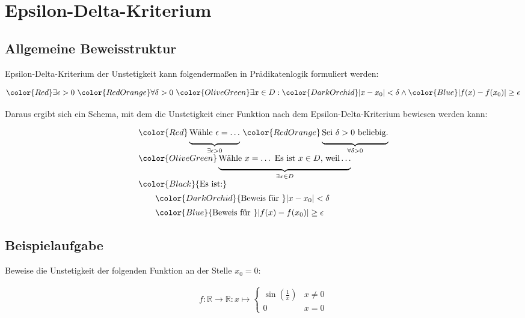 \documentclass[fontsize=9pt,
               parskip=half-,
               DIV=14,
               listof=chapterentry,
               tocflat]{scrbook}
\begin{document}
\section{Epsilon-Delta-Kriterium}

\subsection{Allgemeine Beweisstruktur}

Epsilon-Delta-Kriterium der Unstetigkeit kann folgendermaßen in Prädikatenlogik formuliert werden:

\begin{align*}
{\color {Red}\exists \epsilon >0}\ {\color {RedOrange}\forall \delta >0}\ {\color {OliveGreen}\exists x\in D}:{\color {DarkOrchid}|x-x_{0}|<\delta }\land {\color {Blue}|f(x)-f(x_{0})|\geq \epsilon }
\end{align*}

Daraus ergibt sich ein Schema, mit dem die Unstetigkeit einer Funktion nach dem Epsilon-Delta-Kriterium bewiesen werden kann:

\begin{align*}
{\begin{array}{l}{\color {Red}\underbrace {{\underset {}{}}{\text{Wähle }}\epsilon =\ldots } _{\exists \epsilon >0}}\ {\color {RedOrange}\underbrace {{\underset {}{}}{\text{Sei }}\delta >0{\text{ beliebig.}}} _{\forall \delta >0}}\\{\color {OliveGreen}\underbrace {{\underset {}{}}{\text{Wähle }}x=\ldots {\text{ Es ist }}x\in D{\text{, weil}}\ldots } _{\exists x\in D}}\\{\color {Black}{\text{Es ist:}}}\\[0.5em]\quad \quad {\color {DarkOrchid}{\text{Beweis für }}|x-x_{0}|<\delta }\\[0.5em]\quad \quad {\color {Blue}{\text{Beweis für }}|f(x)-f(x_{0})|\geq \epsilon }\end{array}}
\end{align*}

\subsection{Beispielaufgabe}

\begin{exercise*}
Beweise die Unstetigkeit der folgenden Funktion an der Stelle $x_{0}=0$:

\begin{align*}
f:\mathbb {R} \to \mathbb {R} :x\mapsto {\begin{cases}\sin \left({\frac {1}{x}}\right)&x\neq 0\\0&x=0\end{cases}}
\end{align*}

\end{exercise*}
\end{document}
